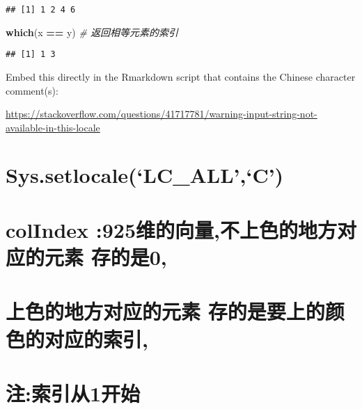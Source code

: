 \documentclass[]{article}
\newenvironment{Shaded}{\begin{snugshade}}{\end{snugshade}}
\newcommand{\KeywordTok}[1]{\textcolor[rgb]{0.13,0.29,0.53}{\textbf{#1}}}
\newcommand{\DecValTok}[1]{\textcolor[rgb]{0.00,0.00,0.81}{#1}}
\newcommand{\StringTok}[1]{\textcolor[rgb]{0.31,0.60,0.02}{#1}}
\newcommand{\CommentTok}[1]{\textcolor[rgb]{0.56,0.35,0.01}{\textit{#1}}}
\newcommand{\ControlFlowTok}[1]{\textcolor[rgb]{0.13,0.29,0.53}{\textbf{#1}}}
\newcommand{\OperatorTok}[1]{\textcolor[rgb]{0.81,0.36,0.00}{\textbf{#1}}}
\newcommand{\NormalTok}[1]{#1}
\begin{document}
\begin{verbatim}
## [1] 1 2 4 6
\end{verbatim}

\begin{Shaded}
\begin{Highlighting}[]
\KeywordTok{which}\NormalTok{(x }\OperatorTok{==}\StringTok{ }\NormalTok{y) }\CommentTok{# 返回相等元素的索引}
\end{Highlighting}
\end{Shaded}

\begin{verbatim}
## [1] 1 3
\end{verbatim}

Embed this directly in the Rmarkdown script that contains the Chinese
character comment(s):

\url{https://stackoverflow.com/questions/41717781/warning-input-string-not-available-in-this-locale}

\section{\texorpdfstring{Sys.setlocale(`LC\_ALL',`C')}{Sys.setlocale(LC\_ALL,C)}}\label{sys.setlocalelc_allc}

\section{colIndex :925维的向量,不上色的地方对应的元素
存的是0,}\label{colindex-925-0}

\section{上色的地方对应的元素 存的是要上的颜色的对应的索引,}\label{-}

\section{注:索引从1开始}\label{1}

\begin{Shaded}
\end{Shaded}
\end{document}

